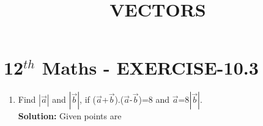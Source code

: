\documentclass[10pt]{article}
\newcommand{\solution}{\noindent \textbf{Solution: }}
\providecommand{\abs}[1]{\left\vert#1\right\vert}
\begin{document}
\begin{center}
\title{\textbf{VECTORS}}
\date{\vspace{-5ex}} %
\maketitle
\end{center}

\section{12$^{th}$ Maths - EXERCISE-10.3}

\begin{enumerate}
\item Find $\abs{\overrightarrow{a}}$ and $\abs{\overrightarrow{b}}$, if ($\overrightarrow{a}$+$\overrightarrow{b}$)$.$($\overrightarrow{a}$-$\overrightarrow{b}$)=8 and ${\overrightarrow{a}}$=8$\abs{\overrightarrow{b}}$.\\  

\solution
Given  points are


\end{enumerate}
\end{document}
